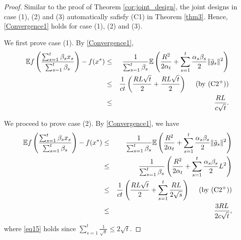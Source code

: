 \documentclass[sn-mathphys]{JORSC-jnl}%
\theoremstyle{thmstyleone}%
\theoremstyle{thmstylethree}%
\begin{document}
\begin{proof}
	Similar to the proof of Theorem \ref{cor:joint_design}, the joint designs in case (1), (2) and (3) automatically safisfy (C1) in Theorem \ref{thm3}. Hence, \eqref{Convergence1} holds for case (1), (2) and (3).
	
	We first prove case (1). By \eqref{Convergence1},
	\begin{eqnarray}
		\mathbb{E}f\left( \frac{\sum_{s=1}^t \beta_s x_s}{\sum_{s=1}^t \beta_s} \right) - f(x^*)
		&\leq& \frac{1}{\sum_{s=1}^t \beta_s}\mathbb{E}\left(\frac{R^2}{2\alpha_t}+\sum_{s=1}^{t}\frac{\alpha_s\beta_s}{2}\Vert \tilde{g}_s \Vert^2\right)\nonumber\\
		&\leq&\frac{1}{ct} \left(\frac{RL\sqrt{t}}{2}+\frac{RL\sqrt{t}}{2}\right)~~~~({\rm by~ (C2^+)})\nonumber\\
		&\leq& \frac{RL}{c\sqrt{t}}.\nonumber
	\end{eqnarray}
	
	We proceed to prove case (2). By \eqref{Convergence1}, we have
	\begin{eqnarray}
		\mathbb{E}f\left( \frac{\sum_{s=1}^t \beta_s x_s}{\sum_{s=1}^t \beta_s} \right) - f(x^*) 
		&\leq& \frac{1}{\sum_{s=1}^t \beta_s}\mathbb{E}\left(\frac{R^2}{2\alpha_t}+\sum_{s=1}^{t}\frac{\alpha_s\beta_s}{2}\Vert \tilde{g}_s \Vert^2\right)\nonumber\\
		&\leq& \frac{1}{\sum_{s=1}^{t}\beta_s}
		\left(
		\frac{R^2}{2 \alpha_t}
		+ \sum_{s=1}^{t} \frac{\alpha_s\beta_s}{2} L^2
		\right)\nonumber\\
		&\leq&\frac{1}{ct}\left(\frac{RL\sqrt{t}}{2}+\sum_{s=1}^{t} \frac{RL}{2\sqrt{s}}\right)~~~~({\rm by~ (C2^+)})\nonumber\\
		&\leq& \frac{3RL}{2c\sqrt{t}},\label{eq15}
	\end{eqnarray}
	where \eqref{eq15} holds since $\sum_{s=1}^{t} \frac{1}{\sqrt{s}} \le 2\sqrt{t}$.
	

\end{proof}
\end{document}
